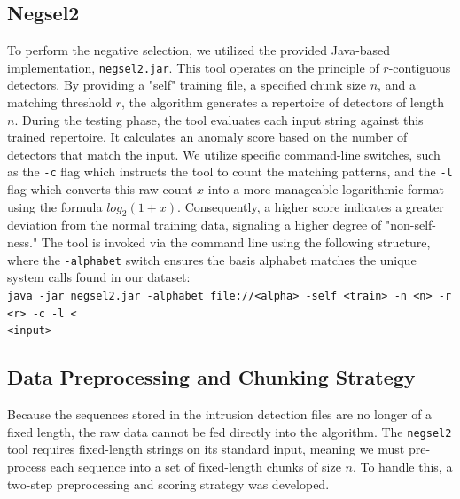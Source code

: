 \documentclass{article}
\begin{document}
\subsection{Negsel2}
To perform the negative selection, we utilized the provided Java-based implementation, \texttt{negsel2.jar}. This tool operates on the principle of $r$-contiguous detectors. By providing a "self" training file, a specified chunk size $n$, and a matching threshold $r$, 
the algorithm generates a repertoire of detectors of length $n$. During the testing phase, the tool evaluates each input string against this trained repertoire. It calculates an anomaly score  based on the number of detectors that match the input. We utilize specific 
command-line switches, such as the \texttt{-c} flag which instructs the tool to count the matching patterns, and the \texttt{-l} flag which converts this raw count $x$ into a more manageable logarithmic format using the formula $log_{2}(1+x)$. 
Consequently, a higher score indicates a greater deviation from the normal training data, signaling a higher degree of "non-self-ness." The tool is invoked via the command line using the following structure, where the \texttt{-alphabet} switch ensures the basis alphabet matches the unique 
system calls found in our dataset: \\
\texttt{java -jar negsel2.jar -alphabet file://<alpha> -self <train> -n <n> -r <r> -c -l < \\<input>}

\subsection{Data Preprocessing and Chunking Strategy}
Because the sequences stored in the intrusion detection files are no longer of a fixed length, the raw data cannot be fed directly into the algorithm. The \texttt{negsel2} tool requires fixed-length strings on its standard input, meaning we must pre-process each sequence into a set of 
fixed-length chunks of size $n$. To handle this, a two-step preprocessing and scoring strategy was developed.
\end{document}
